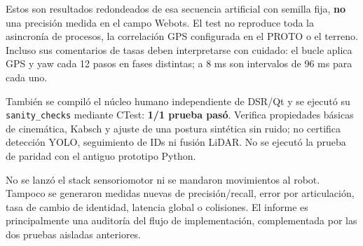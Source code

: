 \documentclass[11pt,a4paper]{article}
\newcommand{\code}[1]{\nolinkurl{#1}}
\begin{document}
Estos son resultados redondeados de esa secuencia artificial con semilla fija,
\textbf{no} una precisión medida en el campo Webots. El test no reproduce toda la
asincronía de procesos, la correlación GPS configurada en el PROTO o el terreno.
Incluso sus comentarios de tasas deben interpretarse con cuidado: el bucle aplica
GPS y yaw cada 12 pasos en fases distintas; a 8 ms son intervalos de 96 ms para cada
uno.~\cite{ekf}

También se compiló el núcleo humano independiente de DSR/Qt y se ejecutó su
\code{sanity_checks} mediante CTest: \textbf{1/1 prueba pasó}. Verifica propiedades
básicas de cinemática, Kabsch y ajuste de una postura sintética sin ruido;
no certifica detección YOLO, seguimiento de IDs ni
fusión LiDAR. No se ejecutó la prueba de paridad con el antiguo prototipo Python.
\cite{humantest,humancmake}

No se lanzó el stack sensoriomotor ni se mandaron movimientos al robot. Tampoco se
generaron medidas nuevas de precisión/recall, error por articulación, tasa de
cambio de identidad, latencia global o colisiones. El informe es principalmente
una auditoría del flujo de implementación, complementada por las dos pruebas
aisladas anteriores.
\end{document}
